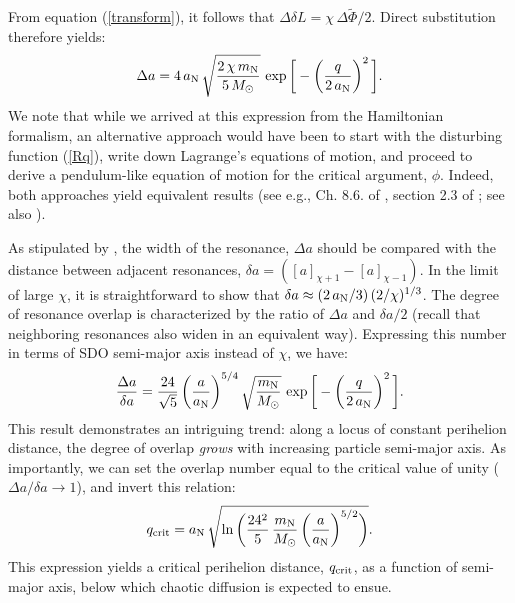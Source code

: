 \documentclass[twocolumn]{aastex62}
\newcommand{\Msun}{M_{\odot}}
\newcommand{\mn}{m_{\rm{N}}}
\newcommand{\an}{a_{\rm{N}}}
\begin{document}
From equation (\ref{transform}), it follows that $\Delta\delta L=\chi\,\Delta\tilde{\Phi}/2$. Direct substitution therefore yields: 
\begin{align}
\Delta a = 4\,a_{\rm{N}}\,\sqrt{\frac{2\,\chi\,\mn}{5\,\Msun}} \, \exp\bigg[-\bigg(\frac{q}{2\,\an}\bigg)^2\,\bigg].
\label{deltaa}
\end{align}
We note that while we arrived at this expression from the Hamiltonian formalism, an alternative approach would have been to start with the disturbing function (\ref{Rq}), write down Lagrange's equations of motion, and proceed to derive a pendulum-like equation of motion for the critical argument, $\phi$. Indeed, both approaches yield equivalent results (see e.g., Ch. 8.6. of \citealt{MD99}, section 2.3 of \citealt{2013MNRAS.435.2187M}; see also \citealt{1980AJ.....85.1122W, Mardling2008Chaos}). 

As stipulated by \citet{1959SPhD....4..390C,Chirikov1979}, the width of the resonance, $\Delta a$ should be compared with the distance between adjacent resonances, $\delta a = ([a]_{\chi+1}-[a]_{\chi-1})$. In the limit of large $\chi$, it is straightforward to show that $\delta a \approx (2\,\an/3)\,(2/\chi)^{1/3}$. The degree of resonance overlap is characterized by the ratio of $\Delta a$ and $\delta a/2$ (recall that neighboring resonances also widen in an equivalent way). Expressing this number in terms of SDO semi-major axis instead of $\chi$, we have:
\begin{align}
\frac{\Delta a}{\delta a} = \frac{24}{\sqrt{5}}\,\bigg(\frac{a}{\an}\bigg)^{5/4}\,\sqrt{\frac{\mn}{\Msun} }\,\exp\bigg[-\bigg(\frac{q}{2\,\an}\bigg)^2\,\bigg].
\label{K}
\end{align}
This result demonstrates an intriguing trend: along a locus of constant perihelion distance, the degree of overlap \textit{grows} with increasing particle semi-major axis. As importantly, we can set the overlap number equal to the critical value of unity ($\Delta a/\delta a\rightarrow1$), and invert this relation:
\begin{align}
q_{\rm{crit}}=\an\,\sqrt{\ln\bigg( \frac{24^2}{5}\,\frac{\mn}{\Msun }\,\bigg(\frac{a}{\an}\bigg)^{5/2}\bigg)}. 
\label{qcrit}
\end{align}
This expression yields a critical perihelion distance, $q_{\rm{crit}}$, as a function of semi-major axis, below which chaotic diffusion is expected to ensue. 
\end{document}
